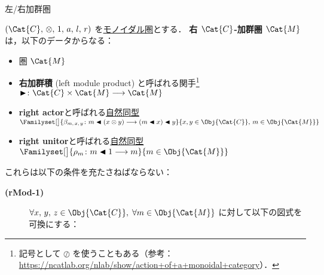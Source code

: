 \documentclass[TQFT_main]{subfiles}
\begin{document}
\begin{mydef}[label=def:modulecat,breakable]{左/右加群圏}
\begin{description}
    \end{description}

    \tcblower

    $(\Cat{C},\, \otimes,\, 1,\, a,\, l,\, r)$ を\hyperref[redef:monoidal-category]{モノイダル圏}とする．
    \textbf{右 $\Cat{C}$-加群圏} $\Cat{M}$ は，以下のデータからなる：
    \begin{itemize}
        \item 圏 $\Cat{M}$
        \item \textbf{右加群積} (left module product) と呼ばれる関手\footnote{記号として $\oslash$ を使うこともある（参考：\url{https://ncatlab.org/nlab/show/action+of+a+monoidal+category}）．} $\btr \colon \Cat{C} \times \Cat{M} \lto \Cat{M}$
        \item \textbf{right actor}と呼ばれる\hyperref[def:nat]{自然同型} $\Familyset[\big]{\beta_{m,\, x,\, y} \colon m \btl (x \otimes y) \lto (m \btl x) \btl y}{x,y \in \Obj{\Cat{C}},\, m \in \Obj{\Cat{M}}}$
        \item \textbf{right unitor}と呼ばれる\hyperref[def:nat]{自然同型} $\Familyset[\big]{\rho_{m} \colon m \btl 1 \lto m}{m \in \Obj{\Cat{M}}}$
    \end{itemize}
    これらは以下の条件を充たさねばならない：
    \begin{description}
        \item[\textbf{(rMod-1)}] $\forall x,\,y,\, z \in \Obj{\Cat{C}},\; \forall m \in \Obj{\Cat{M}}$ に対して以下の図式を可換にする：
        \begin{center}
\end{center}
\end{description}
\end{mydef}
\end{document}
